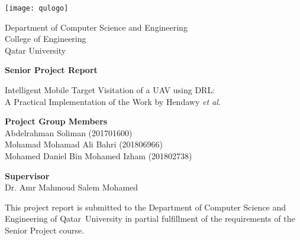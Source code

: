 \documentclass[../main.tex]{subfiles}
\begin{document}


        \centering
        \texttt{[image: qulogo]}

        \Large
        Department of Computer Science and Engineering\\
        College of Engineering\\
        Qatar University\\

        \vspace{2.5cm}

        \Huge
        \textbf{Senior Project Report}

        \vspace{1.0cm}
        \Large
        Intelligent Mobile Target Visitation of a UAV using DRL:\\
        A Practical Implementation of the Work by Hendawy \textit{et al.}

        \vspace{2.5cm}

        \raggedright
        \large
        \textbf{Project Group Members}\\
        \normalsize
        \medskip
        \-\hspace{0.5cm} Abdelrahman Soliman (201701600)\\
        \-\hspace{0.5cm} Mohamad Mohamad Ali Bahri (201806966)\\
        \-\hspace{0.5cm} Mohamed Daniel Bin Mohamed Izham (201802738)\\

        \vspace{1.0cm}

        \large
        \textbf{Supervisor}\\
        \normalsize
        \medskip
        \-\hspace{0.5cm} Dr. Amr Mahmoud Salem Mohamed\\

        \vfill

        \small

        \raggedright
        This project report is submitted to the Department
        of Computer Science and Engineering of Qatar~University 
        in partial fulfillment of the
        requirements of the Senior Project course.

        \vspace{0.8cm}
\end{document}
